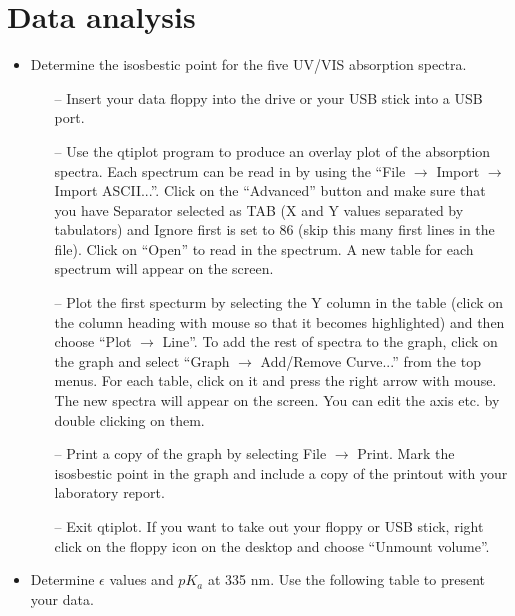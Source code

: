 \documentclass[byrevtex,amssymb,aps,pra,floatfix,letterpaper]{revtex4}
\begin{document}
\section{Data analysis}

\begin{itemize}
\item Determine the isosbestic point for the five UV/VIS absorption spectra.\\

\begin{itemize}
\item[--] Insert your data floppy into the drive or your USB stick into a USB port.

\item[--] Use the qtiplot program to produce an overlay plot of the absorption spectra. Each spectrum can be read in by using the ``File $\rightarrow$ Import $\rightarrow$ Import ASCII...''. Click on the ``Advanced'' button and make sure that you have Separator selected as TAB (X and Y values separated by tabulators) and Ignore first is set to 86 (skip this many first lines in the file). Click on ``Open'' to read in the spectrum. A new table for each spectrum will appear on the screen. 

\item[--] Plot the first specturm by selecting the Y column in the table (click on the column heading with mouse so that it becomes highlighted) and then choose ``Plot $\rightarrow$ Line''. To add the rest of spectra to the graph, click on the graph and select ``Graph $\rightarrow$ Add/Remove Curve...'' from the top menus. For each table, click on it and press the right arrow with mouse. The new spectra will appear on the screen. You can edit the axis etc. by double clicking on them.

\item[--] Print a copy of the graph by selecting File $\rightarrow$ Print. Mark the isosbestic point in the graph and include a copy of the printout with your laboratory report.

\item[--] Exit qtiplot. If you want to take out your floppy or USB stick, right click on the floppy icon on the desktop and choose ``Unmount volume''.

\end{itemize}

\item Determine $\epsilon$ values and $pK_a$ at 335 nm. Use the following table to present your data.\\


\end{itemize}
\end{document}
